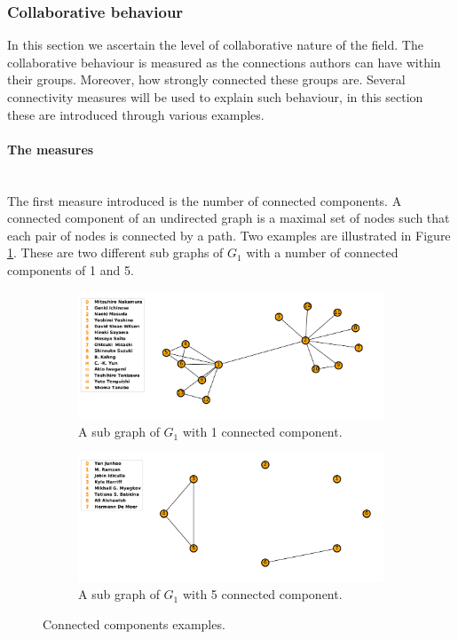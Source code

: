 \documentclass{article}
\theoremstyle{definition}
\begin{document}
\subsubsection{Collaborative behaviour}

In this section we ascertain the level of collaborative nature of the field.
The collaborative behaviour is measured as the connections authors can
have within their groups. Moreover, how strongly connected these groups are.
Several connectivity measures will be used to explain such behaviour, in this
section these are introduced through various examples.

\paragraph{The measures}
\mbox{ }\\

The first measure introduced is the number of connected components. A connected
component of an undirected graph is a maximal set of nodes such that each pair
of nodes is connected by a path. Two examples are illustrated in Figure
\ref{fig:connected_components}. These are two different sub graphs of \(G_1\)
with a number of connected components of 1 and 5.

\begin{center}
\begin{figure}[!hbtp]
    \begin{subfigure}{0.5\textwidth}
        \includegraphics[width=\textwidth]{./assets/images/connected_example_one.pdf}
        \caption{A sub graph of \(G_1\) with 1 connected component.}
    \end{subfigure}
    \begin{subfigure}{0.5\textwidth}
        \includegraphics[width=\textwidth]{./assets/images/connected_example_two.pdf}
        \caption{A sub graph of \(G_1\) with 5 connected component.}
    \end{subfigure}
\caption{Connected components examples.}
\label{fig:connected_components}
\end{figure}
\end{center}
\end{document}
